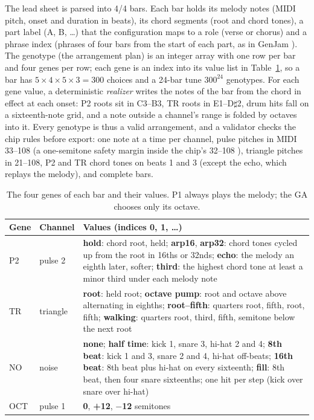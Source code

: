 \documentclass{article}
\begin{document}
The lead sheet is parsed into 4/4 bars. Each bar holds its melody notes (MIDI pitch, onset and
duration in beats), its chord segments (root and chord tones), a part label (A, B, \ldots) that
the configuration maps to a role (verse or chorus) and a phrase index (phrases of four bars from
the start of each part, as in GenJam \cite{biles1994genjam}). The genotype (the arrangement plan)
is an integer array with one row per bar and four genes per row; each gene is an index into its
value list in Table~\ref{tab:genes}, so a bar has $5 \times 4 \times 5 \times 3 = 300$ choices and
a 24-bar tune $300^{24}$ genotypes. For each gene value, a deterministic \emph{realizer} writes
the notes of the bar from the chord in effect at each onset: P2 roots sit in C3--B3, TR roots in
E1--D$\sharp$2, drum hits fall on a sixteenth-note grid, and a note outside a channel's range is
folded by octaves into it. Every genotype is thus a valid arrangement, and a validator checks the
chip rules before export: one note at a time per channel, pulse pitches in MIDI 33--108 (a
one-semitone safety margin inside the chip's 32--108 \cite{donahue2018nes}), triangle pitches in
21--108, P2 and TR chord tones on beats 1 and 3 (except the echo, which replays the melody), and
complete bars.

\begin{table}[t]
 \centering
 \footnotesize
 \setlength{\tabcolsep}{3pt}
 \begin{tabular}{@{}llp{}@{}}
  \toprule
  Gene & Channel & Values (indices 0, 1, \ldots) \\
  \midrule
  P2 & pulse 2 & \textbf{hold}: chord root, held; \textbf{arp16}, \textbf{arp32}: chord tones
  cycled up from the root in 16ths or 32nds; \textbf{echo}: the melody an eighth later, softer;
  \textbf{third}: the highest chord tone at least a minor third under each melody note \\
  TR & triangle & \textbf{root}: held root; \textbf{octave pump}: root and octave above
  alternating in eighths; \textbf{root--fifth}: quarters root, fifth, root, fifth;
  \textbf{walking}: quarters root, third, fifth, semitone below the next root \\
  NO & noise & \textbf{none}; \textbf{half time}: kick 1, snare 3, hi-hat 2 and 4;
  \textbf{8th beat}: kick 1 and 3, snare 2 and 4, hi-hat off-beats; \textbf{16th beat}: 8th beat
  plus hi-hat on every sixteenth; \textbf{fill}: 8th beat, then four snare sixteenths; one hit
  per step (kick over snare over hi-hat) \\
  OCT & pulse 1 & \textbf{0}, \textbf{+12}, \textbf{$-$12} semitones \\
  \bottomrule
 \end{tabular}
 \caption{The four genes of each bar and their values. P1 always plays the melody; the GA chooses
 only its octave.}
 \label{tab:genes}
\end{table}
\end{document}

